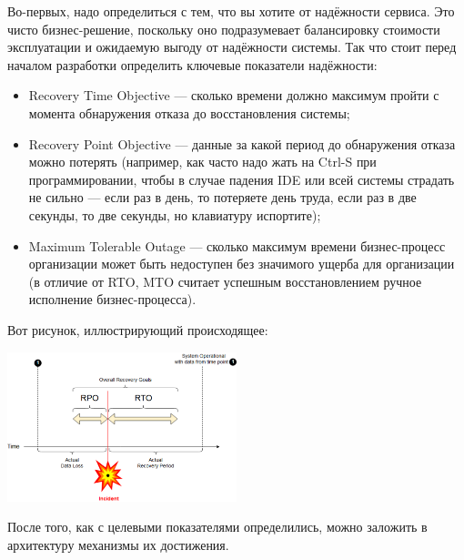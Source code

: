 \documentclass{../text-style}
\begin{document}
Во-первых, надо определиться с тем, что вы хотите от надёжности сервиса. Это чисто бизнес-решение, поскольку оно подразумевает балансировку стоимости эксплуатации и ожидаемую выгоду от надёжности системы. Так что стоит перед началом разработки определить ключевые показатели надёжности: 
\begin{itemize}
    \item Recovery Time Objective --- сколько времени должно максимум пройти с момента обнаружения отказа до восстановления системы;
    \item Recovery Point Objective --- данные за какой период до обнаружения отказа можно потерять (например, как часто надо жать на Ctrl-S при программировании, чтобы в случае падения IDE или всей системы страдать не сильно --- если раз в день, то потеряете день труда, если раз в две секунды, то две секунды, но клавиатуру испортите);
    \item Maximum Tolerable Outage --- сколько максимум времени бизнес-процесс организации может быть недоступен без значимого ущерба для организации (в отличие от RTO, MTO считает успешным восстановлением ручное исполнение бизнес-процесса).
\end{itemize}

Вот рисунок, иллюстрирующий происходящее:

\begin{center}
    \includegraphics[width=0.5\textwidth]{rpoRtoExample.png}
\end{center}

После того, как с целевыми показателями определились, можно заложить в архитектуру механизмы их достижения.
\end{document}
